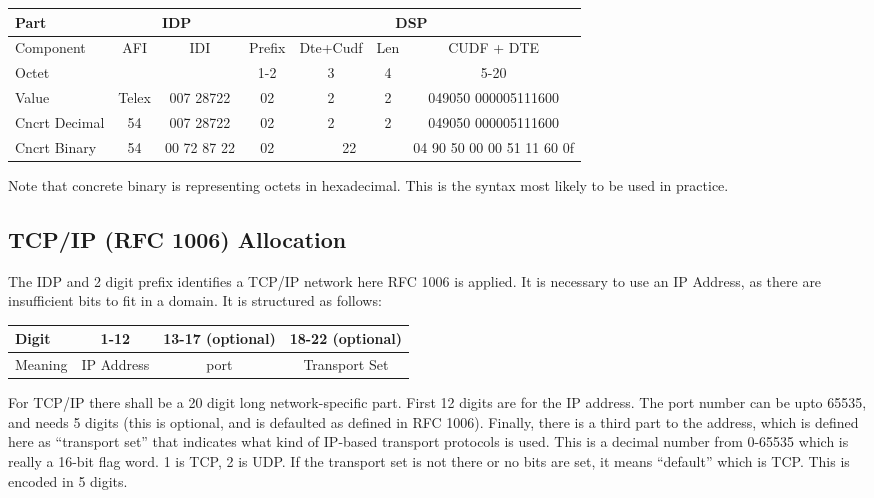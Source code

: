 \begin {center}
\begin {small}
\begin {tabular}{|l||c|c|c|c|c|c|}
\hline
Part & \multicolumn{2}{c|}{IDP} &  \multicolumn{4}{c|}{DSP} \\
\hline
Component & AFI & IDI & Prefix & Dte+Cudf & Len & CUDF + DTE  \\
\hline
Octet & & & 1-2 & 3 & 4 & 5-20 \\
\hline
Value & Telex & 007 28722 & 02 & 2 & 2 &  049050 000005111600 \\
\hline
\hline
Cncrt Decimal & 54  & 007 28722 & 02 & 2 & 2 &  049050 000005111600 \\
\hline
Cncrt Binary & 54 & 00 72 87 22 & 02 & \multicolumn{2}{c|}{22} & 04 90 50
 00 00 51 11 60 0f \\
\hline
\end {tabular}
\end {small}
\end {center}

Note that concrete binary is representing octets in hexadecimal.  This is
the syntax most likely to be used in practice.

\subsection {TCP/IP (RFC 1006) Allocation}


The IDP and 2 digit prefix identifies a TCP/IP network here RFC 1006 is
applied.
It is necessary to use an IP Address, as there are insufficient bits
to fit in a domain.  It is structured as follows:

\begin {center}
\begin {tabular}{|l||c|c|c|}
\hline
Digit & 1-12 & 13-17 (optional) & 18-22 (optional) \\
\hline
Meaning  & IP Address & port & Transport Set \\
\hline
\end {tabular}
\end {center}


For TCP/IP there shall be a 20 digit long network-specific part.  First
12 digits are for the IP address.  The port number can be upto 65535, and
needs 5 digits (this is optional, and is defaulted as defined in RFC 1006).
Finally,
there is a third part to the address, which is defined here as 
``transport set''
that indicates what kind of IP-based transport protocols is used.
This is a decimal number from 0-65535 which is really a 16-bit flag
word.  1 is TCP, 2 is UDP.  If the transport set is not there or
no bits are set, it means ``default'' which is TCP.  This is
encoded in 5 digits.



